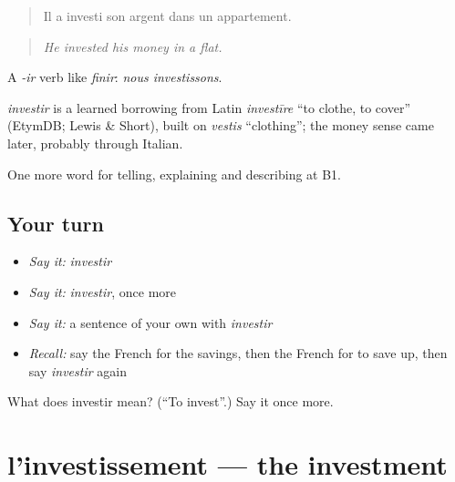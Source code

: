 \begin{quote}
Il a investi son argent dans un appartement.
\end{quote}

\begin{quote}
\emph{He invested his money in a flat.}
\end{quote}

A \emph{-ir} verb like \emph{finir}: \emph{nous investissons}.

\begin{cousinweb}
\emph{investir} is a learned borrowing from Latin \emph{investīre} \textquotedblleft{}to clothe, to cover\textquotedblright{} (EtymDB; Lewis \& Short), built on \emph{vestis} \textquotedblleft{}clothing\textquotedblright{}; the money sense came later, probably through Italian.
\end{cousinweb}

\begin{grammarlens}[title={What you've built}]
One more word for telling, explaining and describing at B1.
\end{grammarlens}

\subsection*{Your turn}
\begin{itemize}
\raggedright
  \item \emph{Say it:} \emph{investir}
  \item \emph{Say it:} \emph{investir}, once more
  \item \emph{Say it:} a sentence of your own with \emph{investir}
  \item \emph{Recall:} say the French for the savings, then the French for to save up, then say \emph{investir} again
\end{itemize}

\begin{tcolorbox}[breakable,colback=teal!4,colframe=teal!35!black,title={Before you move on}]
What does investir mean? (\textquotedblleft{}To invest\textquotedblright{}.) Say it once more.
\end{tcolorbox}
\section[l'investissement]{l'investissement — the investment}

\label{lesson:FR-C391-investissement}



